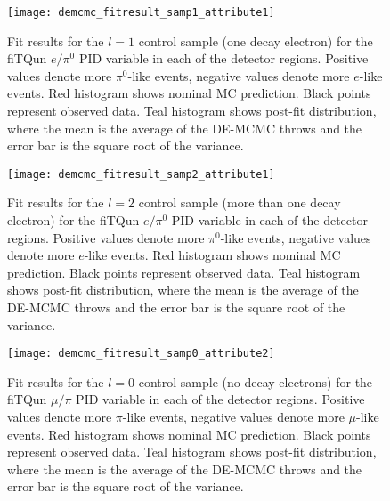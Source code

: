 \begin{figure}[h]
  \begin{center}
    \texttt{[image: demcmc\_fitresult\_samp1\_attribute1]} 
  \end{center}
  \caption{Fit results for the $l=1$ control sample (one decay electron) for
  the fiTQun $e/\pi^{0}$ PID variable in each of the detector regions. Positive
  values denote more $\pi^{0}$-like events, negative values denote more
  $e$-like events. Red histogram shows nominal MC prediction.  Black points
  represent observed data.  Teal histogram shows post-fit distribution, where
  the mean is the average of the DE-MCMC throws and the error bar is the square
  root of the variance.}
  \label{fig:fitresults_samp1_att1}
\end{figure}


\begin{figure}[h]
  \begin{center}
    \texttt{[image: demcmc\_fitresult\_samp2\_attribute1]} 
  \end{center}
  \caption{Fit results for the $l=2$ control sample (more than one decay
  electron) for the fiTQun $e/\pi^{0}$ PID variable in each of the detector
  regions.  Positive values denote more $\pi^{0}$-like events, negative values
  denote more $e$-like events. Red histogram shows nominal MC prediction.
  Black points represent observed data.  Teal histogram shows post-fit
  distribution, where the mean is the average of the DE-MCMC throws and the
  error bar is the square root of the variance.}
  \label{fig:fitresults_samp2_att1}
\end{figure}


\begin{figure}[h]
  \begin{center}
    \texttt{[image: demcmc\_fitresult\_samp0\_attribute2]} 
  \end{center}
  \caption{Fit results for the $l=0$ control sample (no decay electrons) for
  the fiTQun $\mu/\pi$ PID variable in each of the detector regions. Positive
  values denote more $\pi$-like events, negative values denote more $\mu$-like
  events. Red histogram shows nominal MC prediction.  Black points represent
  observed data.  Teal histogram shows post-fit distribution, where the mean is
  the average of the DE-MCMC throws and the error bar is the square root of the
  variance.}
  \label{fig:fitresults_samp0_att2}
\end{figure}


